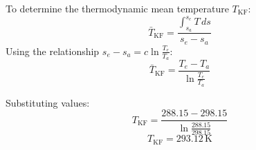 To determine the thermodynamic mean temperature \( T_{\text{KF}} \):  
\[
\bar{T}_{\text{KF}} = \frac{\int_{s_a}^{s_e} T \, ds}{s_e - s_a}
\]  
Using the relationship \( s_e - s_a = c \ln \frac{T_e}{T_a} \):  
\[
\bar{T}_{\text{KF}} = \frac{T_e - T_a}{\ln \frac{T_e}{T_a}}
\]  

Substituting values:  
\[
T_{\text{KF}} = \frac{288.15 - 298.15}{\ln \frac{288.15}{298.15}}
\]  
\[
T_{\text{KF}} = 293.12 \, \text{K}
\]